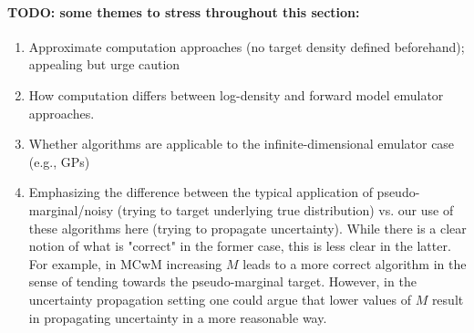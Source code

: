 \documentclass[12pt]{article}
\begin{document}
\paragraph{TODO: some themes to stress throughout this section:}
\begin{enumerate}
\item Approximate computation approaches (no target density defined beforehand); appealing but urge caution
\item How computation differs between log-density and forward model emulator approaches.
\item Whether algorithms are applicable to the infinite-dimensional emulator case (e.g., GPs)
\item Emphasizing the difference between the typical application of pseudo-marginal/noisy (trying to target underlying true
distribution) vs. our use of these algorithms here (trying to propagate uncertainty). While there is a clear notion of what is
"correct" in the former case, this is less clear in the latter. For example, in MCwM increasing $M$ leads to a 
more correct algorithm in the sense of tending towards the pseudo-marginal target. However, in the uncertainty
propagation setting one could argue that lower values of $M$ result in propagating uncertainty in a more 
reasonable way.
\end{enumerate}
\end{document}
